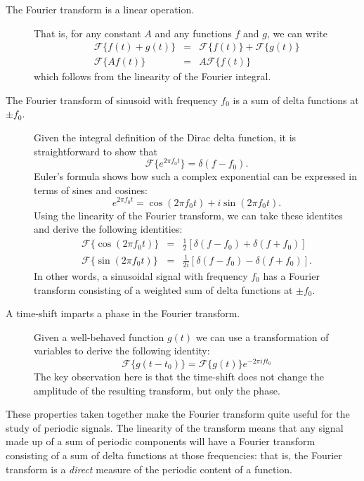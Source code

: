 \documentclass[preprint]{aastex}
\newcommand{\eqlabel}[1]{\label{eq:#1}}
\begin{document}
\begin{description}
   \item[The Fourier transform is a linear operation.]
     That is, for any constant $A$ and any functions $f$ and $g$, we can write
     \begin{eqnarray}
       \mathcal{F}\{f(t) + g(t)\} &=& \mathcal{F}\{f(t)\} + \mathcal{F}\{g(t)\}\nonumber\\
       \mathcal{F}\{A f(t)\} &=& A\mathcal{F}\{f(t)\}
     \end{eqnarray}
     which follows from the linearity of the Fourier integral.

   \item[The Fourier transform of sinusoid with frequency $f_0$ is a sum of delta functions at $\pm f_0$.]
     Given the integral definition of the Dirac delta function, it is straightforward to show that
     \begin{equation}
       \mathcal{F}\{e^{2\pi f_0 t}\} = \delta(f - f_0).
       \eqlabel{delta-FT}
     \end{equation}
     Euler's formula shows how such a complex exponential
     can be expressed in terms of sines and cosines:
     \begin{equation}
       e^{2\pi f_0 t} = \cos(2\pi f_0 t) + i\sin(2\pi f_0 t).
       \eqlabel{Euler-formula}
     \end{equation}
     Using the linearity of the Fourier transform, we can take these identites
     and derive the following identities:
     \begin{eqnarray}
       \mathcal{F}\{\cos(2\pi f_0 t)\} &=& \frac{1}{2}\left[\delta(f - f_0) + \delta(f + f_0)\right]\nonumber\\
       \mathcal{F}\{\sin(2\pi f_0 t)\} &=& \frac{1}{2i}\left[\delta(f - f_0) - \delta(f + f_0)\right].
     \end{eqnarray}
     In other words, a sinusoidal signal with frequency $f_0$ has a Fourier transform consisting of a weighted sum of delta functions at $\pm f_0$.

   \item[A time-shift imparts a phase in the Fourier transform.]
     Given a well-behaved function $g(t)$ we can use a transformation of
     variables to derive the following identity:
     \begin{equation}
       \mathcal{F}\{g(t - t_0)\} = \mathcal{F}\{g(t)\} e^{-2\pi i ft_0}
     \end{equation}
     The key observation here is that the time-shift does not change the
     amplitude of the resulting transform, but only the phase.
\end{description}
These properties taken together make the Fourier transform quite useful for the study of periodic signals.
The linearity of the transform means that any signal made up of a sum of periodic components will have a Fourier transform consisting of a sum of delta functions at those frequencies: that is, the Fourier transform is a {\it direct} measure of the periodic content of a function.
\end{document}
